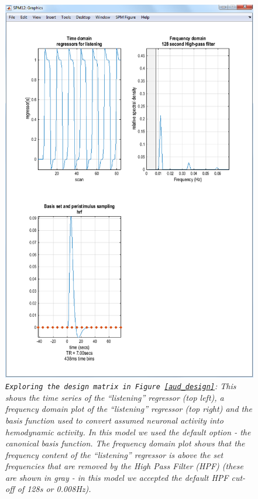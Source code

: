 \begin{figure}
\begin{center}
\includegraphics[width=125mm]{auditory/explore}
\caption{\emph{\texttt{Exploring the design matrix in Figure~\ref{aud_design}}: This shows the time series of the ``listening'' regressor (top left), a frequency domain plot of the ``listening'' regressor (top right) and the basis function used to convert assumed neuronal activity into hemodynamic activity. In this model we used the default option - the canonical basis function. The frequency domain plot shows that the frequency content of the ``listening'' regressor is above the set frequencies that are removed by the High Pass Filter (HPF) (these are shown in gray - in this model we accepted the default HPF cut-off of 128s or 0.008Hz). \label{aud_explore}}}
\end{center}
\end{figure}

